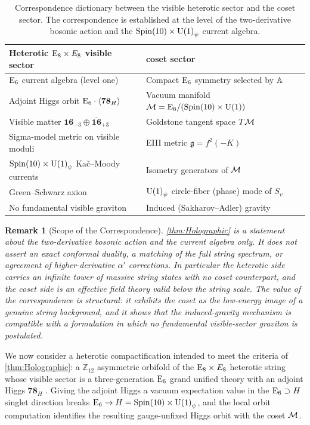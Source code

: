 \documentclass[pdflatex,sn-mathphys-num]{sn-jnl}
\theoremstyle{thmstyleone}
\theoremstyle{thmstylethree}%
\theoremstyle{thmstyletwo}%
\newtheorem{remark}[remark]{Remark}
\begin{document}
\begin{table}[t]
\centering
\caption{Correspondence dictionary between the visible heterotic sector and the
coset sector. The correspondence is established at the level of the
two-derivative bosonic action and the $\operatorname{Spin}(10)\times\mathrm{U(1)}_\psi$ current algebra.}
\label{tab:Dictionary}
\begin{tabular}{@{}ll@{}}
\toprule
Heterotic $\mathrm{E}_{8}\times E_{8}$ visible sector & coset sector \\
\midrule
$\mathrm{E}_{6}$ current algebra (level one)          & Compact $\mathrm{E}_{6}$ symmetry selected by $\mathbb{A}$ \\
Adjoint Higgs orbit $\mathrm{E}_{6}\cdot\langle\mathbf{78}_H\rangle$ & Vacuum manifold $\mathcal{M}=\mathrm{E}_{6}/(\operatorname{Spin}(10) \times \mathrm{U(1)})$ \\
Visible matter $\mathbf{16}_{-3}\oplus\overline{\mathbf{16}}_{+3}$    & Goldstone tangent space $T\mathcal{M}$ \\
Sigma-model metric on visible moduli          & EIII metric $\mathfrak g=f^{2}(-K)$ \\
$\operatorname{Spin}(10)\times\mathrm{U(1)}_\psi$ Ka\v{c}--Moody currents & Isometry generators of $\mathcal{M}$ \\
Green--Schwarz axion                          & $\mathrm{U(1)}_\psi$ circle-fiber (phase) mode of $S_{v}$ \\
No fundamental visible graviton               & Induced (Sakharov--Adler) gravity \\
\bottomrule
\end{tabular}
\end{table}

\begin{remark}[Scope of the Correspondence]
\label{rmk:HolographicScope}
\autoref{thm:Holographic} is a statement about the two-derivative bosonic action
and the current algebra only. It does not assert an exact conformal duality, a
matching of the full string spectrum, or agreement of higher-derivative
$\alpha'$ corrections. In particular the heterotic side carries an infinite
tower of massive string states with no coset counterpart, and the coset side is an
effective field theory valid below the string scale. The value of the
correspondence is structural: it exhibits the coset as the low-energy image
of a genuine string background, and it shows that the induced-gravity mechanism
is compatible with a formulation in which no fundamental visible-sector
graviton is postulated.
\end{remark}

We now consider a heterotic compactification intended to meet the criteria of
\autoref{thm:Holographic}: a $\mathbb Z_{12}$ asymmetric orbifold of the
$\mathrm{E}_{8}\times E_{8}$ heterotic string \cite{DHVW:1985,Narain:1986} whose visible
sector is a three-generation $\mathrm{E}_{6}$ grand unified theory with an adjoint Higgs
$\mathbf{78}_{H}$ \cite{Z12Heterotic}. Giving the adjoint Higgs a vacuum expectation
value in the $\mathrm{E}_{6}\supset H$ singlet direction breaks $\mathrm{E}_{6}\to H=\operatorname{Spin}(10) \times \mathrm{U(1)}_\psi$,
and the local orbit computation identifies the resulting gauge-unfixed Higgs
orbit with the coset $\mathcal{M}$.
\end{document}

